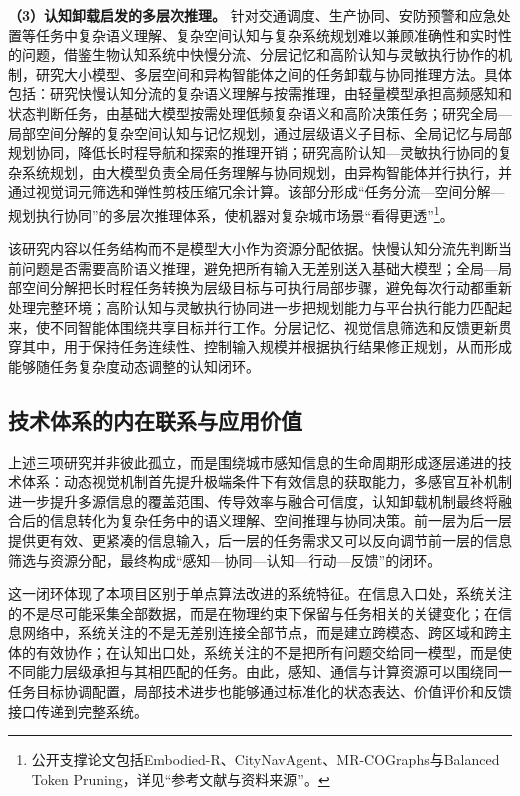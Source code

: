 \textbf{（3）认知卸载启发的多层次推理。}
针对交通调度、生产协同、安防预警和应急处置等任务中复杂语义理解、复杂空间认知与复杂系统规划难以兼顾准确性和实时性的问题，借鉴生物认知系统中快慢分流、分层记忆和高阶认知与灵敏执行协作的机制，研究大小模型、多层空间和异构智能体之间的任务卸载与协同推理方法。具体包括：研究快慢认知分流的复杂语义理解与按需推理，由轻量模型承担高频感知和状态判断任务，由基础大模型按需处理低频复杂语义和高阶决策任务；研究全局---局部空间分解的复杂空间认知与记忆规划，通过层级语义子目标、全局记忆与局部规划协同，降低长时程导航和探索的推理开销；研究高阶认知---灵敏执行协同的复杂系统规划，由大模型负责全局任务理解与协同规划，由异构智能体并行执行，并通过视觉词元筛选和弹性剪枝压缩冗余计算。该部分形成“任务分流---空间分解---规划执行协同”的多层次推理体系，使机器对复杂城市场景“看得更透”\footnote{公开支撑论文包括Embodied-R、CityNavAgent、MR-COGraphs与Balanced Token Pruning，详见“参考文献与资料来源”。}。

该研究内容以任务结构而不是模型大小作为资源分配依据。快慢认知分流先判断当前问题是否需要高阶语义推理，避免把所有输入无差别送入基础大模型；全局---局部空间分解把长时程任务转换为层级目标与可执行局部步骤，避免每次行动都重新处理完整环境；高阶认知与灵敏执行协同进一步把规划能力与平台执行能力匹配起来，使不同智能体围绕共享目标并行工作。分层记忆、视觉信息筛选和反馈更新贯穿其中，用于保持任务连续性、控制输入规模并根据执行结果修正规划，从而形成能够随任务复杂度动态调整的认知闭环。

\subsection{技术体系的内在联系与应用价值}

上述三项研究并非彼此孤立，而是围绕城市感知信息的生命周期形成逐层递进的技术体系：动态视觉机制首先提升极端条件下有效信息的获取能力，多感官互补机制进一步提升多源信息的覆盖范围、传导效率与融合可信度，认知卸载机制最终将融合后的信息转化为复杂任务中的语义理解、空间推理与协同决策。前一层为后一层提供更有效、更紧凑的信息输入，后一层的任务需求又可以反向调节前一层的信息筛选与资源分配，最终构成“感知---协同---认知---行动---反馈”的闭环。

这一闭环体现了本项目区别于单点算法改进的系统特征。在信息入口处，系统关注的不是尽可能采集全部数据，而是在物理约束下保留与任务相关的关键变化；在信息网络中，系统关注的不是无差别连接全部节点，而是建立跨模态、跨区域和跨主体的有效协作；在认知出口处，系统关注的不是把所有问题交给同一模型，而是使不同能力层级承担与其相匹配的任务。由此，感知、通信与计算资源可以围绕同一任务目标协调配置，局部技术进步也能够通过标准化的状态表达、价值评价和反馈接口传递到完整系统。

